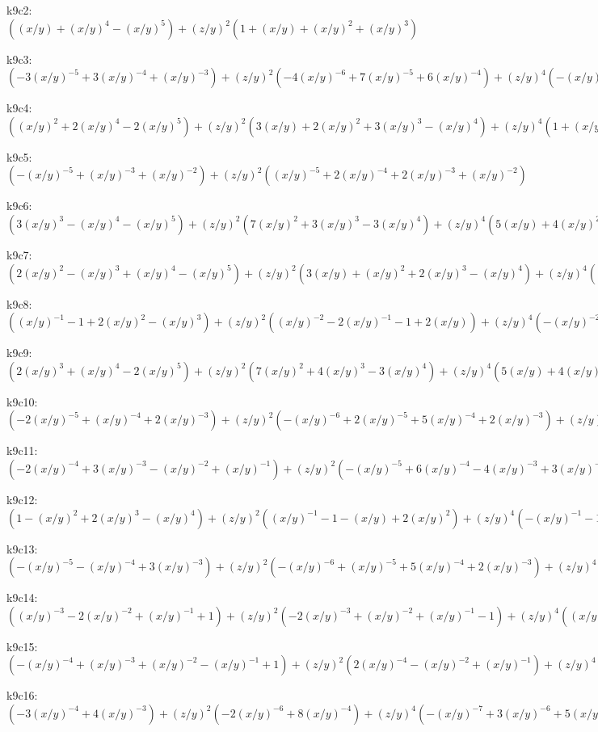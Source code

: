 k9c2: $ ((x/y)+(x/y)^{4}-(x/y)^{5})  +(z/y)^{2}(1+(x/y)+(x/y)^{2}+(x/y)^{3}) $ 

k9c3: $ (-3(x/y)^{-5}+3(x/y)^{-4}+(x/y)^{-3})  +(z/y)^{2}(-4(x/y)^{-6}+7(x/y)^{-5}+6(x/y)^{-4})  +(z/y)^{4}(-(x/y)^{-7}+5(x/y)^{-6}+5(x/y)^{-5})  +(z/y)^{6}((x/y)^{-7}+(x/y)^{-6}) $ 

k9c4: $ ((x/y)^{2}+2(x/y)^{4}-2(x/y)^{5})  +(z/y)^{2}(3(x/y)+2(x/y)^{2}+3(x/y)^{3}-(x/y)^{4})  +(z/y)^{4}(1+(x/y)+(x/y)^{2}) $ 

k9c5: $ (-(x/y)^{-5}+(x/y)^{-3}+(x/y)^{-2})  +(z/y)^{2}((x/y)^{-5}+2(x/y)^{-4}+2(x/y)^{-3}+(x/y)^{-2}) $ 

k9c6: $ (3(x/y)^{3}-(x/y)^{4}-(x/y)^{5})  +(z/y)^{2}(7(x/y)^{2}+3(x/y)^{3}-3(x/y)^{4})  +(z/y)^{4}(5(x/y)+4(x/y)^{2}-(x/y)^{3})  +(z/y)^{6}(1+(x/y)) $ 

k9c7: $ (2(x/y)^{2}-(x/y)^{3}+(x/y)^{4}-(x/y)^{5})  +(z/y)^{2}(3(x/y)+(x/y)^{2}+2(x/y)^{3}-(x/y)^{4})  +(z/y)^{4}(1+(x/y)+(x/y)^{2}) $ 

k9c8: $ ((x/y)^{-1}-1+2(x/y)^{2}-(x/y)^{3})  +(z/y)^{2}((x/y)^{-2}-2(x/y)^{-1}-1+2(x/y))  +(z/y)^{4}(-(x/y)^{-2}-(x/y)^{-1}) $ 

k9c9: $ (2(x/y)^{3}+(x/y)^{4}-2(x/y)^{5})  +(z/y)^{2}(7(x/y)^{2}+4(x/y)^{3}-3(x/y)^{4})  +(z/y)^{4}(5(x/y)+4(x/y)^{2}-(x/y)^{3})  +(z/y)^{6}(1+(x/y)) $ 

k9c10: $ (-2(x/y)^{-5}+(x/y)^{-4}+2(x/y)^{-3})  +(z/y)^{2}(-(x/y)^{-6}+2(x/y)^{-5}+5(x/y)^{-4}+2(x/y)^{-3})  +(z/y)^{4}((x/y)^{-6}+2(x/y)^{-5}+(x/y)^{-4}) $ 

k9c11: $ (-2(x/y)^{-4}+3(x/y)^{-3}-(x/y)^{-2}+(x/y)^{-1})  +(z/y)^{2}(-(x/y)^{-5}+6(x/y)^{-4}-4(x/y)^{-3}+3(x/y)^{-2})  +(z/y)^{4}(2(x/y)^{-5}-4(x/y)^{-4}+(x/y)^{-3})  -(x/y)^{-5}(z/y)^{6} $ 

k9c12: $ (1-(x/y)^{2}+2(x/y)^{3}-(x/y)^{4})  +(z/y)^{2}((x/y)^{-1}-1-(x/y)+2(x/y)^{2})  +(z/y)^{4}(-(x/y)^{-1}-1) $ 

k9c13: $ (-(x/y)^{-5}-(x/y)^{-4}+3(x/y)^{-3})  +(z/y)^{2}(-(x/y)^{-6}+(x/y)^{-5}+5(x/y)^{-4}+2(x/y)^{-3})  +(z/y)^{4}((x/y)^{-6}+2(x/y)^{-5}+(x/y)^{-4}) $ 

k9c14: $ ((x/y)^{-3}-2(x/y)^{-2}+(x/y)^{-1}+1)  +(z/y)^{2}(-2(x/y)^{-3}+(x/y)^{-2}+(x/y)^{-1}-1)  +(z/y)^{4}((x/y)^{-3}+(x/y)^{-2}) $ 

k9c15: $ (-(x/y)^{-4}+(x/y)^{-3}+(x/y)^{-2}-(x/y)^{-1}+1)  +(z/y)^{2}(2(x/y)^{-4}-(x/y)^{-2}+(x/y)^{-1})  +(z/y)^{4}(-(x/y)^{-4}-(x/y)^{-3}) $ 

k9c16: $ (-3(x/y)^{-4}+4(x/y)^{-3})  +(z/y)^{2}(-2(x/y)^{-6}+8(x/y)^{-4})  +(z/y)^{4}(-(x/y)^{-7}+3(x/y)^{-6}+5(x/y)^{-5})  +(z/y)^{6}((x/y)^{-7}+(x/y)^{-6}) $ 

